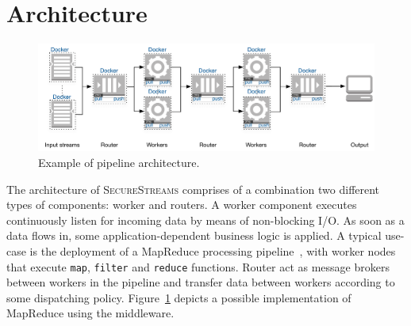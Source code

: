 \section{Architecture}
\label{sec:architecture}
\begin{figure}[!t]
  \centering
  \includegraphics[scale=0.7]{images/architecture_pipeline}
  \caption{Example of \SYS pipeline architecture.}
  \label{fig:architecture_pipeline}
\end{figure}


The architecture of \textsc{SecureStreams} comprises of a combination two different types of components: worker and routers.
A worker component executes continuously listen for incoming data by means of non-blocking I/O.
As soon as a data flows in, some application-dependent business logic is applied.
A typical use-case is the deployment of a MapReduce processing pipeline~\cite{Dean:2008:MSD:1327452.1327492}, with worker nodes that execute \texttt{map}, \texttt{filter} and \texttt{reduce} functions.
Router act as message brokers between workers in the pipeline and transfer data between workers according to some dispatching policy.
Figure~\ref{fig:architecture_pipeline} depicts a possible implementation of MapReduce using the \SYS middleware.

